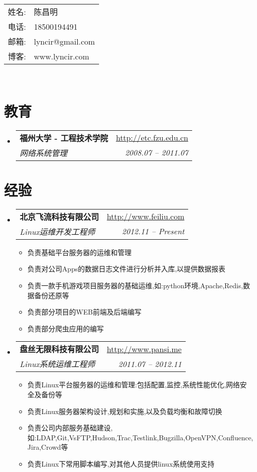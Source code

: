 \documentclass[11pt,letterpaper]{article}
\makeatletter
\newcommand{\resitem}[1]{\item #1 \vspace{-2pt}}
\newcommand{\ressubheading}[4]{
\begin{tabular*}{6.5in}{l@{\extracolsep{\fill}}r}
	\textbf{#1} & \url{#2} \\
	\textit{#3} & \textit{#4} \\
\end{tabular*}\vspace{-6pt}}
\makeatother
\begin{document}
\begin{CJK}{UTF8}{gbsn}

\begin{tabular}{p{1.2cm}l}
	姓名: & 陈昌明 \\
	电话: & 18500194491 \\
	邮箱: & lyncir@gmail.com \\
	博客: & www.lyncir.com \\
\end{tabular}
\\
\vspace{0.1in}

\section{教育}  
	\begin{itemize}
	 	\item    
			\ressubheading{福州大学 - 工程技术学院}{http://etc.fzu.edu.cn}{网络系统管理}{2008.07 -- 2011.07}
	\end{itemize}

\section {经验}   
	\begin{itemize}
		\item 
			\ressubheading{北京飞流科技有限公司}{http://www.feiliu.com}{Linux运维开发工程师}{2012.11 -- Present}
				{ \footnotesize
				\begin{itemize}
						\resitem{负责基础平台服务器的运维和管理}
						\resitem{负责对公司Apps的数据日志文件进行分析并入库,以提供数据报表}
						\resitem{负责一款手机游戏项目服务器的基础运维,如:python环境,Apache,Redis,数据备份还原等}
						\resitem{负责部分项目的WEB前端及后端编写}
						\resitem{负责部分爬虫应用的编写}
				\end{itemize}
			 	}     
		\item 
			\ressubheading{盘丝无限科技有限公司}{http://www.pansi.me}{Linux系统运维工程师}{2011.07 -- 2012.11}
				{ \footnotesize
				\begin{itemize}
						\resitem{负责Linux平台服务器的运维和管理:包括配置,监控,系统性能优化,网络安全及备份等}
						\resitem{负责Linux服务器架构设计,规划和实施,以及负载均衡和故障切换}
						\resitem{负责公司内部服务基础建设,如:LDAP,Git,VsFTP,Hudson,Trac,Testlink,Bugzilla,OpenVPN,Confluence,Jira,Crowd等}
						\resitem{负责Linux下常用脚本编写,对其他人员提供linux系统使用支持}
				\end{itemize}
			 	}     
	\end{itemize}


\end{CJK}
\end{document}
